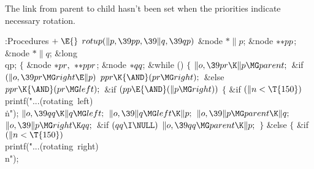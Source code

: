 The link from parent to child hasn't been set when the
priorities
indicate necessary rotation.

\Y\B\4:Procedures\X${}\mathrel+\E{}$\6
$\\{rotup}(\|p,\39\\{pp},\39\|q,\39\\{qp}){}$\1\1\6
\&{node} ${}{*}\|p{}$;\6
\&{node} ${}{*}{*}\\{pp}{}$;\6
\&{node} ${}{*}\|q{}$;\6
\&{long} \\{qp};\2\2\6
${}\{{}$\5
\1\&{node} ${}{*}\\{pr},{}$ ${}{*}{*}\\{ppr}{}$;\6
\&{node} ${}{*}\\{qq}{}$;\7
\&{while} ()\5
${}\{{}$\1\6
${}\|o,\39\\{pr}\K\|p\MG\\{parent};{}$\6
\&{if} ${}(\|o,\39\\{pr}\MG\\{right}\E\|p){}$\1\5
${}\\{ppr}\K{\AND}(\\{pr}\MG\\{right});{}$\2\6
\&{else}\1\5
${}\\{ppr}\K{\AND}(\\{pr}\MG\\{left});{}$\2\6
\&{if} ${}(\\{pp}\E{\AND}(\|p\MG\\{right})){}$\5
${}\{{}$\1\6
\&{if} ${}(\|n<\T{150}){}$\1\5
\\{printf}(\.{"...(rotating\ left)\\}\)\.{n"});\2\6
${}\|o,\39\\{qq}\K\|q\MG\\{left};{}$\6
${}\|o,\39\|q\MG\\{left}\K\|p;{}$\6
${}\|o,\39\|p\MG\\{parent}\K\|q;{}$\6
${}\|o,\39\|p\MG\\{right}\K\\{qq};{}$\6
\&{if} ${}(\\{qq}\I\NULL){}$\1\5
${}\|o,\39\\{qq}\MG\\{parent}\K\|p;{}$\2\6
\4${}\}{}$\2\6
\&{else}\5
${}\{{}$\1\6
\&{if} ${}(\|n<\T{150}){}$\1\5
\\{printf}(\.{"...(rotating\ right)}\)\.{\\n"});\2\6
